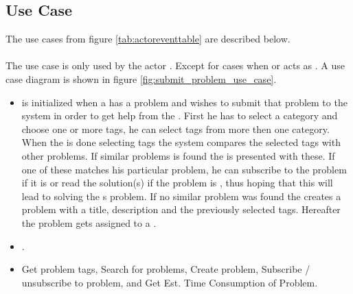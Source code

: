 \subsection{Use Case}
\label{sec:usecase}

The use cases from figure \ref{tab:actoreventtable} are described below.  

\paragraph{\ucsproblem[c]} The use case \ucsproblem[] is only used by the actor \aclient. Except for cases when \astaff{} or \sadmin{}  acts as \aclient{}. A use case diagram is shown in figure \ref{fig:submit_problem_use_case}. 
\begin{itemize}
\item {} \ucsproblem[c] is initialized when a \aclient{} has a problem and wishes to submit that problem to the system in order to get help from the \astaff{}. 
First he has to select a category and choose one or more tags, he can select tags from more then one category. 
When the \aclient{} is done selecting tags the system compares the selected tags with other problems. 
If similar problems is found the \aclient{} is presented with these.
If one of these matches his particular problem, he can subscribe to the problem if it is \open[] or read the solution(s) if the problem is \closed{}, thus hoping that this will lead to solving the \aclient s problem.
If no similar problem was found the \aclient{} creates a problem with a title, description and the previously selected tags. 
Hereafter the problem gets assigned to a \astaff{}. 

\item {} .

\item {} Get problem tags, Search for problems, Create problem, Subscribe / unsubscribe to problem, and Get Est. Time Consumption of Problem. 
\end{itemize}

